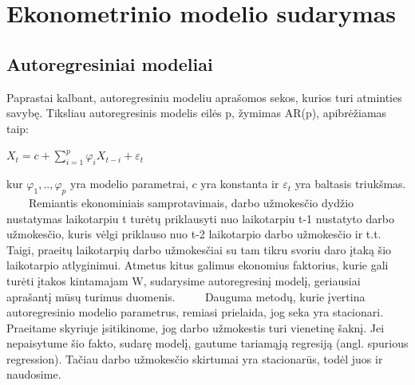 \documentclass[12pt,a4paper]{article}
\theoremstyle{change}\newtheorem{salyga}{Uždavinys}
\begin{document}
\pagebreak









\section{Ekonometrinio modelio sudarymas}
\bigskip





\subsection{Autoregresiniai modeliai}
\medskip
\hspace{40pt}Paprastai kalbant, autoregresiniu modeliu aprašomos sekos, kurios turi atminties savybę. Tiksliau autoregresinis modelis eilės p, žymimas AR(p), apibrėžiamas taip: 
\begin{center}
\large $ X_t=c+\sum\limits_{i=1}^{p}\varphi_i X_{t-i}+\varepsilon_t $
\end{center}
kur $ \varphi_1,..,\varphi_p $ yra modelio parametrai, $ c $ yra konstanta ir $ \varepsilon_t $ yra baltasis triukšmas.
\vskip 8pt
$\qquad$Remiantis ekonominiais samprotavimais, darbo užmokesčio dydžio nustatymas laikotarpiu t turėtų priklausyti nuo laikotarpiu t-1 nustatyto darbo užmokesčio, kuris vėlgi  priklauso nuo t-2 laikotarpio darbo užmokesčio ir t.t. Taigi, praeitų laikotarpių darbo užmokesčiai su tam tikru svoriu daro įtaką šio laikotarpio atlyginimui. Atmetus kitus galimus ekonomius faktorius, kurie gali turėti įtakos kintamajam W, sudarysime autoregresinį modelį, geriausiai aprašantį mūsų turimus duomenis.
\vskip 8pt
$\qquad$ Dauguma metodų, kurie įvertina autoregresinio modelio parametrus, remiasi prielaida, jog seka yra stacionari. Praeitame skyriuje įsitikinome, jog darbo užmokestis turi vienetinę šaknį. Jei nepaisytume šio fakto, sudarę modelį, gautume tariamąją regresiją (angl. spurious regression). Tačiau darbo užmokesčio skirtumai yra stacionarūs, todėl juos ir naudosime.
\vskip 8pt
\end{document}
